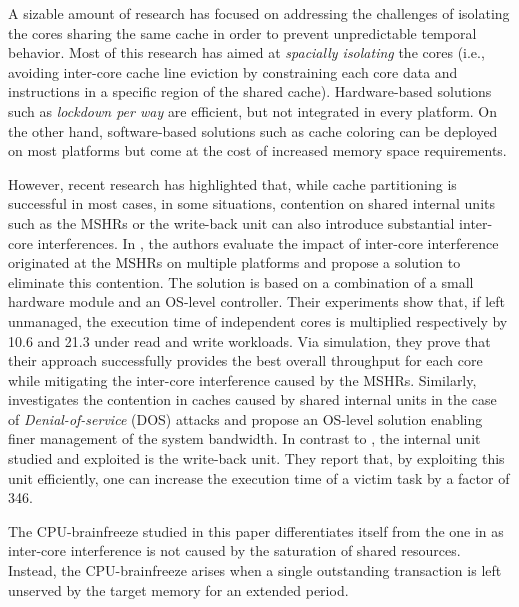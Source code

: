     A sizable amount of research has focused on addressing the challenges of isolating the cores sharing the same cache in order to prevent unpredictable temporal behavior.
    Most of this research \cite{Mancuso2013RealtimeCM, 6755286} has aimed at \emph{spacially isolating} the cores (i.e., avoiding inter-core cache line eviction by constraining each core data and instructions in a specific region of the shared cache).
    Hardware-based solutions such as \emph{lockdown per way} \cite{Giovani_cahe_partitioning_survey} are efficient, but not integrated in every platform.
    On the other hand, software-based solutions such as cache coloring \cite{Mancuso2013RealtimeCM, determ_virt} can be deployed on most platforms but come at the cost of increased memory space requirements.

    However, recent research \cite{Valsan2017AddressingIC, Heechul_DDOS_attacks_on_shared_cache} has highlighted that, while cache partitioning is successful in most cases, in some situations, contention on shared internal units such as the MSHRs or the write-back unit can also introduce substantial inter-core interferences.
    In \cite{Valsan2017AddressingIC}, the authors evaluate the impact of inter-core interference originated at the MSHRs on multiple platforms and propose a solution to eliminate this contention. The solution is based on a combination of a small hardware module and an OS-level controller.
    Their experiments show that, if left unmanaged, the execution time of independent cores is multiplied respectively by 10.6 and 21.3 under read and write workloads.
    Via simulation, they prove that their approach successfully provides the best overall throughput for each core while mitigating the inter-core interference caused by the MSHRs.
    Similarly, \cite{Heechul_DDOS_attacks_on_shared_cache} investigates the contention in caches caused by shared internal units in the case of \emph{Denial-of-service} (DOS) attacks and propose an OS-level solution enabling finer management of the system bandwidth.
    In contrast to \cite{Valsan2017AddressingIC}, the internal unit studied and exploited is the write-back unit.
    They report that, by exploiting this unit efficiently, one can increase the execution time of a victim task by a factor of 346.

    The CPU-brainfreeze studied in this paper differentiates itself from the one in \cite{Valsan2017AddressingIC, Heechul_DDOS_attacks_on_shared_cache} as inter-core interference is not caused by the saturation of shared resources. Instead, the CPU-brainfreeze arises when a single outstanding transaction is left unserved by the target memory for an extended period.
